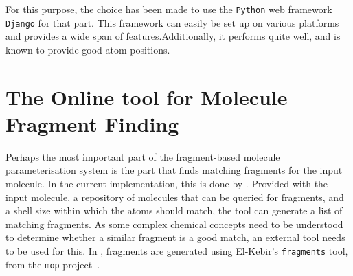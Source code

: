 

For this purpose, the choice has been made to use the \verb|Python| web framework \verb|Django| for that part. This framework can easily be set up on various platforms and provides a wide span of features.Additionally, it performs quite well, and is known to provide good atom positions.



\section[\omfraf]{The Online tool for Molecule Fragment Finding}
Perhaps the most important part of the fragment-based molecule parameterisation system is the part that finds matching fragments for the input molecule. In the current implementation, this is done by \omfraf. Provided with the input molecule, a repository of molecules that can be queried for fragments, and a shell size within which the atoms should match, the tool can generate a list of matching fragments. As some complex chemical concepts need to be understood to determine whether a similar fragment is a good match, an external tool needs to be used for this. In \omfraf, fragments are generated using El-Kebir's \verb|fragments| tool, from the \verb|mop| project~\cite{elkebir2014molecule}.

